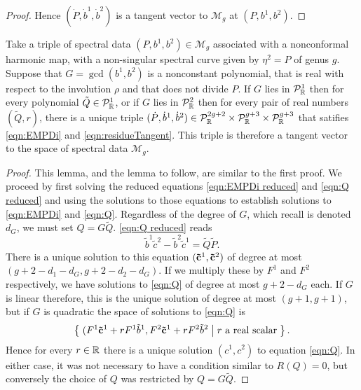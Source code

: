 \begin{lem}[Case (i)]
\begin{proof}
Hence $(\dot{P},\dot{b}^1,\dot{b}^2)$ is a tangent vector to $\mathcal{M}_g$ at $(P,b^1,b^2)$.
\end{proof}
\end{lem}










\begin{lem}[Case (ii)]
    \label{lem:tangent G}
Take a triple of spectral data $(P,b^1,b^2)\in\mathcal{M}_g$ associated with a nonconformal harmonic map, with a non-singular spectral curve given by $η^2 = P$ of genus $g$. Suppose that $G = \gcd(b^1,b^2)$ is a nonconstant polynomial, that is real with respect to the involution $ρ$ and that does not divide $P$. If $G$ lies in $\mathcal{P}^1_\R$ then for every polynomial $\tilde{Q}\in\mathcal{P}^1_\R$, or if $G$ lies in $\mathcal{P}^2_\R$ then for every pair of real numbers $(\tilde{Q},r)$, there is a unique triple $(\dot P, \dot b^1, \dot b^2) \in \mathcal{P}_\R^{2g+2}\times\mathcal{P}_\R^{g+3}\times\mathcal{P}_\R^{g+3}$ that satifies \eqref{eqn:EMPDi} and \eqref{eqn:residueTangent}. This triple is therefore a tangent vector to the space of spectral data $\mathcal{M}_g$.

\begin{proof}
This lemma, and the lemma to follow, are similar to the first proof. We proceed by first solving the reduced equations \eqref{eqn:EMPDi reduced} and \eqref{eqn:Q reduced} and using the solutions to those equations to establish solutions to \eqref{eqn:EMPDi} and \eqref{eqn:Q}. Regardless of the degree of $G$, which recall is denoted $d_G$, we must set $Q = G\tilde{Q}$. \eqref{eqn:Q reduced} reads
\[
\tilde{b}^1\tilde{c}^2 - \tilde{b}^2\tilde{c}^1 = \tilde{Q}\tilde{P}.
\]
There is a unique solution to this equation $({\bf \tilde{c}}^1,{\bf \tilde{c}}^2)$ of degree at most $(g+2-d_1-d_G,g+2-d_2-d_G)$. If we multiply these by $F^1$ and $F^2$ respectively, we have solutions to \eqref{eqn:Q} of degree at most $g+2-d_G$ each. If $G$ is linear therefore, this is the unique solution of degree at most $(g+1,g+1)$, but if $G$ is quadratic the space of solutions to \eqref{eqn:Q} is
\[
\left\{\;  (F^1{\bf \tilde{c}}^1 + rF^1\tilde{b}^1, F^2{\bf \tilde{c}}^1 + rF^2\tilde{b}^2  \;\middle|\;  r \text{ a real scalar}  \;\right\}.
\]
Hence for every $r\in\R$ there is a unique solution $(c^1, c^2)$ to equation \eqref{eqn:Q}. In either case, it was not necessary to have a condition similar to $R(Q)=0$, but conversely the choice of $Q$ was restricted by $Q = G\tilde{Q}$.


\end{proof}
\end{lem}
